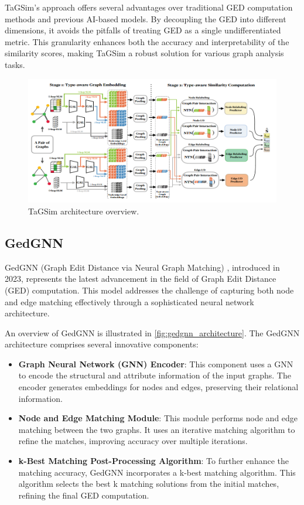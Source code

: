 \documentclass[../Thesis.tex]{subfiles}
\begin{document}
	TaGSim’s approach offers several advantages over traditional GED computation methods and previous AI-based models. By decoupling the GED into different dimensions, it avoids the pitfalls of treating GED as a single undifferentiated metric. This granularity enhances both the accuracy and interpretability of the similarity scores, making TaGSim a robust solution for various graph analysis tasks.
	
	\begin{figure}[H]
		\centering
		\includegraphics[width=\textwidth]{Images/tagsim_architecture.png}
		\caption{TaGSim architecture overview.}
		\label{fig:tagsim_architecture}
	\end{figure}

	\subsection{GedGNN}
	
	GedGNN (Graph Edit Distance via Neural Graph Matching) \cite{computing_graph_edit_distance_via_neural_graph_matching}, introduced in 2023, represents the latest advancement in the field of Graph Edit Distance (GED) computation. This model addresses the challenge of capturing both node and edge matching effectively through a sophisticated neural network architecture.
	
	An overview of GedGNN is illustrated in \autoref{fig:gedgnn_architecture}. The GedGNN architecture comprises several innovative components:
	
	\begin{itemize}
		\item \textbf{Graph Neural Network (GNN) Encoder}: This component uses a GNN to encode the structural and attribute information of the input graphs. The encoder generates embeddings for nodes and edges, preserving their relational information.
		\item \textbf{Node and Edge Matching Module}: This module performs node and edge matching between the two graphs. It uses an iterative matching algorithm to refine the matches, improving accuracy over multiple iterations.
		\item \textbf{k-Best Matching Post-Processing Algorithm}: To further enhance the matching accuracy, GedGNN incorporates a k-best matching algorithm. This algorithm selects the best k matching solutions from the initial matches, refining the final GED computation.
	\end{itemize}
	
\end{document}
